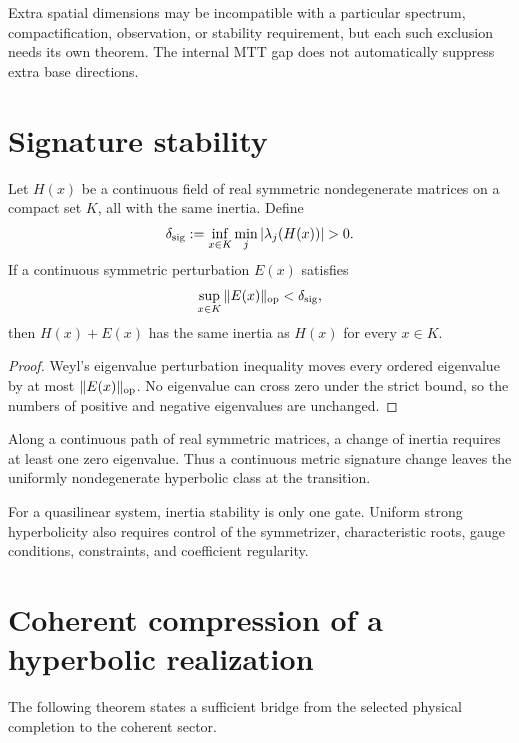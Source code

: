 \documentclass[11pt]{article}
\begin{document}
Extra spatial dimensions may be incompatible with a particular spectrum,
compactification, observation, or stability requirement, but each such
exclusion needs its own theorem. The internal MTT gap does not automatically
suppress extra base directions.

\section{Signature stability}

\begin{theorem}\label{thm:stability}
Let $H(x)$ be a continuous field of real symmetric nondegenerate matrices on a
compact set $K$, all with the same inertia. Define
\[
 \delta_{\rm sig}
 :=\inf_{x\in K}\min_j|\lambda_j(H(x))|>0.
\]
If a continuous symmetric perturbation $E(x)$ satisfies
\[
 \sup_{x\in K}\|E(x)\|_{\rm op}<\delta_{\rm sig},
\]
then $H(x)+E(x)$ has the same inertia as $H(x)$ for every $x\in K$.
\end{theorem}

\begin{proof}
Weyl's eigenvalue perturbation inequality moves every ordered eigenvalue by at
most $\|E(x)\|_{\rm op}$. No eigenvalue can cross zero under the strict bound,
so the numbers of positive and negative eigenvalues are unchanged.
\end{proof}

\begin{corollary}
Along a continuous path of real symmetric matrices, a change of inertia
requires at least one zero eigenvalue. Thus a continuous metric signature
change leaves the uniformly nondegenerate hyperbolic class at the transition.
\end{corollary}

For a quasilinear system, inertia stability is only one gate. Uniform strong
hyperbolicity also requires control of the symmetrizer, characteristic roots,
gauge conditions, constraints, and coefficient regularity.

\section{Coherent compression of a hyperbolic realization}

The following theorem states a sufficient bridge from the selected physical
completion to the coherent sector.
\end{document}

